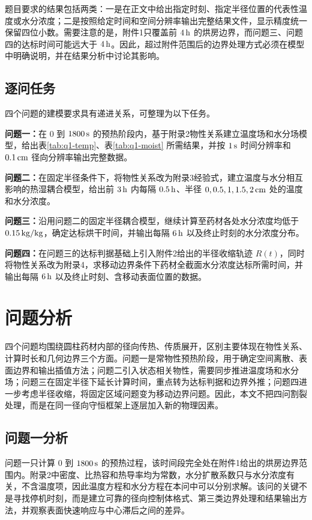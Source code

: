 \documentclass[UTF8,a4paper,12pt]{ctexart}
\numberwithin{equation}{section}
\begin{document}
题目要求的结果包括两类：一是在正文中给出指定时刻、指定半径位置的代表性温度或水分浓度；二是按照给定时间和空间分辨率输出完整结果文件，显示精度统一保留四位小数。需要注意的是，附件1只覆盖前 $4\rm\,h$ 的烘房边界，而问题三、问题四的达标时间可能远大于 $4\rm\,h$。因此，超过附件范围后的边界处理方式必须在模型中明确说明，并在结果分析中讨论其影响。

\subsection{逐问任务}
四个问题的建模要求具有递进关系，可整理为以下任务。

\textbf{问题一：}在 $0$ 到 $1800\rm\,s$ 的预热阶段内，基于附录2物性关系建立温度场和水分场模型，给出表\ref{tab:q1-temp}、表\ref{tab:q1-moist} 所需结果，并按 $1\rm\,s$ 时间分辨率和 $0.1\rm\,cm$ 径向分辨率输出完整数据。

\textbf{问题二：}在固定半径条件下，将物性关系改为附录3经验式，建立温度与水分相互影响的热湿耦合模型，给出前 $3\rm\,h$ 内每隔 $0.5\rm\,h$、半径 $0,0.5,1,1.5,2\rm\,cm$ 处的温度和水分浓度。

\textbf{问题三：}沿用问题二的固定半径耦合模型，继续计算至药材各处水分浓度均低于 $0.15\rm\,kg/kg$，确定达标烘干时间，并输出每隔 $6\rm\,h$ 以及终止时刻的水分浓度分布。

\textbf{问题四：}在问题三的达标判据基础上引入附件2给出的半径收缩轨迹 $R(t)$，同时将物性关系改为附录4，求移动边界条件下药材全截面水分浓度达标所需时间，并输出每隔 $6\rm\,h$ 以及终止时刻、含移动表面位置的数据。

\section{问题分析}
四个问题均围绕圆柱药材内部的径向传热、传质展开，区别主要体现在物性关系、计算时长和几何边界三个方面。问题一是常物性预热阶段，用于确定空间离散、表面边界和输出插值方法；问题二引入状态相关物性，需要同步推进温度场和水分场；问题三在固定半径下延长计算时间，重点转为达标判据和边界外推；问题四进一步考虑半径收缩，将固定区域问题变为移动边界问题。因此，本文不把四问割裂处理，而是在同一径向守恒框架上逐层加入新的物理因素。

\subsection{问题一分析}
问题一只计算 $0$ 到 $1800\rm\,s$ 的预热过程，该时间段完全处在附件1给出的烘房边界范围内。附录2中密度、比热容和热导率均为常数，水分扩散系数只与水分浓度有关，不含温度项，因此温度方程和水分方程在本问中可以分别求解。该问的关键不是寻找停机时刻，而是建立可靠的径向控制体格式、第三类边界处理和结果输出方法，并观察表面快速响应与中心滞后之间的差异。
\end{document}
